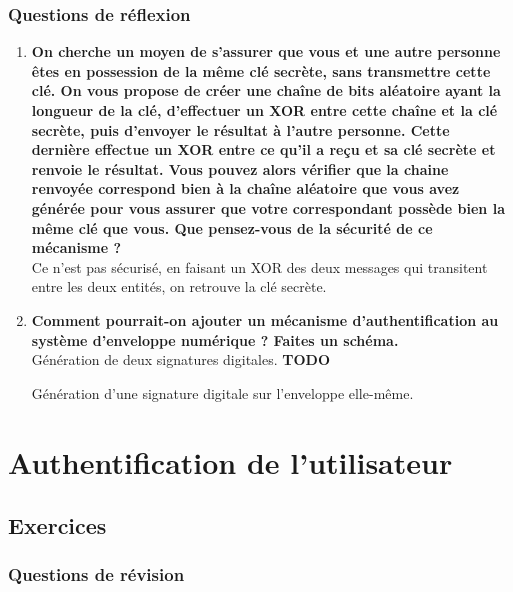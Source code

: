 \documentclass{report}
\begin{document}
		\subsection{Questions de réflexion}

			\begin{enumerate}
				\item \textbf{On cherche un moyen de s’assurer que vous et une autre personne êtes en possession de la même clé secrète, sans transmettre cette clé. On vous propose de créer une chaîne de bits aléatoire ayant la longueur de la clé, d’effectuer un XOR entre cette chaîne et la clé secrète, puis d’envoyer le résultat à l’autre personne. Cette dernière effectue un XOR entre ce qu’il a reçu et sa clé secrète et renvoie le résultat. Vous pouvez alors vérifier que la chaine renvoyée correspond bien à la chaîne aléatoire que vous avez générée pour vous assurer que votre correspondant possède bien la même clé que vous. Que pensez-vous de la sécurité de ce mécanisme ?}\\

					Ce n'est pas sécurisé, en faisant un XOR des deux messages qui transitent entre les deux entités, on retrouve la clé secrète.\\

				\item \textbf{Comment pourrait-on ajouter un mécanisme d’authentification au système d’enveloppe numérique ? Faites un schéma.}\\

					Génération de deux signatures digitales. \textbf{TODO}

					Génération d'une signature digitale sur l'enveloppe elle-même.


			\end{enumerate}

\chapter{Authentification de l'utilisateur}
	
	\section{Exercices}

		\subsection{Questions de révision}
\end{document}
